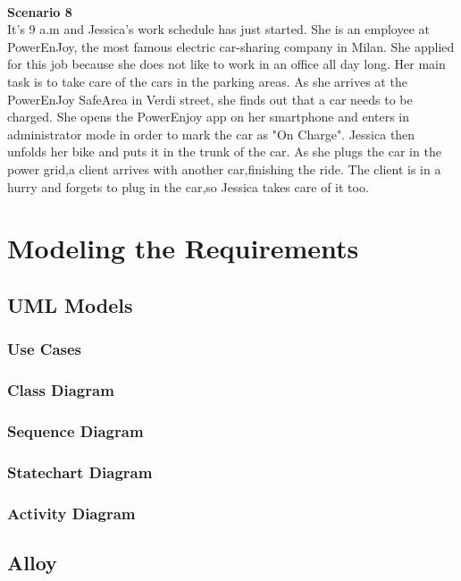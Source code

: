 \documentclass[11pt,a4paper]{report}
\begin{document}
\noindent \\
\textbf{Scenario 8}\\
It's 9 a.m and Jessica's work schedule has just started. She is an employee at PowerEnJoy, the most famous electric car-sharing company in Milan. She applied for this job because she does not like to work in an office all day long. Her main task is to take care of the cars in the parking areas.
As she arrives at the PowerEnJoy SafeArea in Verdi street, she finds out that a car needs to be charged. She opens the PowerEnjoy app on her smartphone and enters in administrator mode in order to mark the car as "On Charge". Jessica then unfolds her bike and puts it in the trunk of the car.
As she plugs the car in the power grid,a client arrives with another car,finishing the ride. The client is in a hurry and forgets to plug in the car,so Jessica takes care of it too.\\
\chapter{Modeling the Requirements}

\section{UML Models}

\subsection{Use Cases}
\subsection{Class Diagram}
\subsection{Sequence Diagram}
\subsection{Statechart Diagram}
\subsection{Activity Diagram}
\section{Alloy}
\end{document}
